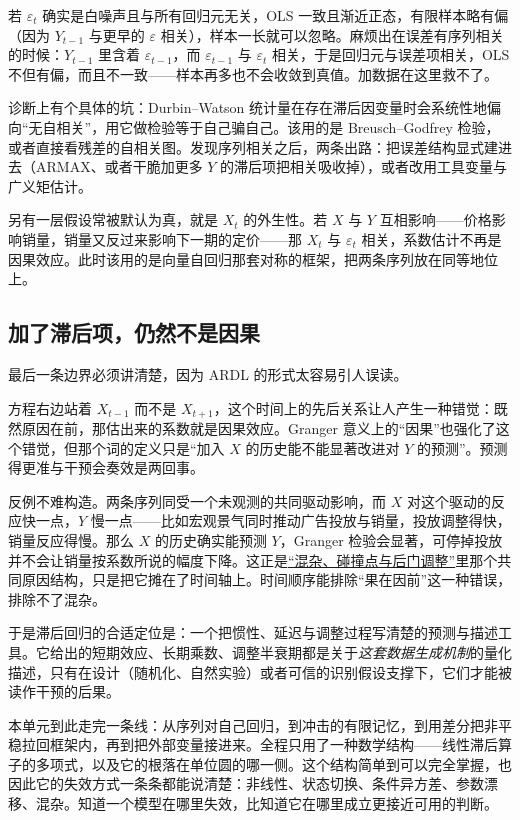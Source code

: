 若 \(\varepsilon_t\) 确实是白噪声且与所有回归元无关，OLS 一致且渐近正态，有限样本略有偏（因为 \(Y_{t-1}\) 与更早的 \(\varepsilon\) 相关），样本一长就可以忽略。麻烦出在误差有序列相关的时候：\(Y_{t-1}\) 里含着 \(\varepsilon_{t-1}\)，而 \(\varepsilon_{t-1}\) 与 \(\varepsilon_t\) 相关，于是回归元与误差项相关，OLS 不但有偏，而且不一致——样本再多也不会收敛到真值。加数据在这里救不了。

诊断上有个具体的坑：Durbin--Watson 统计量在存在滞后因变量时会系统性地偏向``无自相关''，用它做检验等于自己骗自己。该用的是 Breusch--Godfrey 检验，或者直接看残差的自相关图。发现序列相关之后，两条出路：把误差结构显式建进去（ARMAX、或者干脆加更多 \(Y\) 的滞后项把相关吸收掉），或者改用工具变量与广义矩估计。

另有一层假设常被默认为真，就是 \(X_t\) 的外生性。若 \(X\) 与 \(Y\) 互相影响——价格影响销量，销量又反过来影响下一期的定价——那 \(X_t\) 与 \(\varepsilon_t\) 相关，系数估计不再是因果效应。此时该用的是向量自回归那套对称的框架，把两条序列放在同等地位上。

\subsection{加了滞后项，仍然不是因果}

最后一条边界必须讲清楚，因为 ARDL 的形式太容易引人误读。

方程右边站着 \(X_{t-1}\) 而不是 \(X_{t+1}\)，这个时间上的先后关系让人产生一种错觉：既然原因在前，那估出来的系数就是因果效应。Granger 意义上的``因果''也强化了这个错觉，但那个词的定义只是``加入 \(X\) 的历史能不能显著改进对 \(Y\) 的预测''。预测得更准与干预会奏效是两回事。

反例不难构造。两条序列同受一个未观测的共同驱动影响，而 \(X\) 对这个驱动的反应快一点，\(Y\) 慢一点——比如宏观景气同时推动广告投放与销量，投放调整得快，销量反应得慢。那么 \(X\) 的历史确实能预测 \(Y\)，Granger 检验会显著，可停掉投放并不会让销量按系数所说的幅度下降。这正是\hyperref[sec:13-Machine-Learning/12-Causal-Inference/03]{``混杂、碰撞点与后门调整''}里那个共同原因结构，只是把它摊在了时间轴上。时间顺序能排除``果在因前''这一种错误，排除不了混杂。

于是滞后回归的合适定位是：一个把惯性、延迟与调整过程写清楚的预测与描述工具。它给出的短期效应、长期乘数、调整半衰期都是关于\emph{这套数据生成机制}的量化描述，只有在设计（随机化、自然实验）或者可信的识别假设支撑下，它们才能被读作干预的后果。

本单元到此走完一条线：从序列对自己回归，到冲击的有限记忆，到用差分把非平稳拉回框架内，再到把外部变量接进来。全程只用了一种数学结构——线性滞后算子的多项式，以及它的根落在单位圆的哪一侧。这个结构简单到可以完全掌握，也因此它的失效方式一条条都能说清楚：非线性、状态切换、条件异方差、参数漂移、混杂。知道一个模型在哪里失效，比知道它在哪里成立更接近可用的判断。

